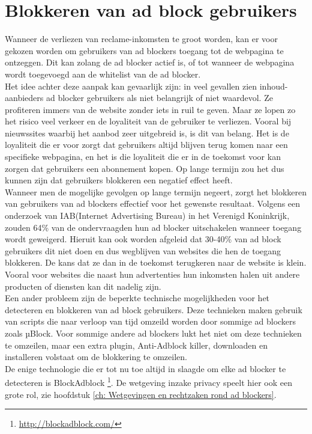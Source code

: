 \documentclass[pdftex,a4paper,12pt,twoside]{report}
\begin{document}
\section{Blokkeren van ad block gebruikers}
\label{sec Blokkeren van ad block gebruikers}
Wanneer de verliezen van reclame-inkomsten te groot worden, kan er voor gekozen worden om gebruikers van ad blockers toegang tot de webpagina te ontzeggen. Dit kan zolang de ad blocker actief is, of tot wanneer de webpagina wordt toegevoegd aan de whitelist van de ad blocker. 
\\
Het idee achter deze aanpak kan gevaarlijk zijn: in veel gevallen zien inhoud-aanbieders ad blocker gebruikers als niet belangrijk of niet waardevol. Ze profiteren immers van de website zonder iets in ruil te geven. Maar ze lopen zo het risico veel verkeer en de loyaliteit van de gebruiker te verliezen. Vooral bij nieuwssites waarbij het aanbod zeer uitgebreid is, is dit van belang. Het is de loyaliteit die er voor zorgt dat gebruikers altijd blijven terug komen naar een specifieke webpagina, en het is die loyaliteit die er in de toekomst voor kan zorgen dat gebruikers een abonnement kopen. Op lange termijn zou het dus kunnen zijn dat gebruikers blokkeren een negatief effect heeft.
\\
Wanneer men de mogelijke gevolgen op lange termijn negeert, zorgt het blokkeren van gebruikers van ad blockers effectief voor het gewenste resultaat. Volgens een onderzoek van IAB(Internet Advertising Bureau) in het Verenigd Koninkrijk, zouden 64\% van de ondervraagden hun ad blocker uitschakelen wanneer toegang wordt geweigerd. Hieruit kan ook worden afgeleid dat 30-40\% van ad block gebruikers dit niet doen en dus wegblijven van websites die hen de toegang blokkeren. De kans dat ze dan in de toekomst terugkeren naar de website is klein. Vooral voor websites die naast hun advertenties hun inkomsten halen uit andere producten of diensten kan dit nadelig zijn.
\\
Een ander probleem zijn de beperkte technische mogelijkheden voor het detecteren en blokkeren van ad block gebruikers. Deze technieken maken gebruik van scripts die naar verloop van tijd omzeild worden door sommige ad blockers zoals µBlock. Voor sommige andere ad blockers lukt het niet om deze technieken te omzeilen, maar een extra plugin, Anti-Adblock killer, downloaden en installeren volstaat om de blokkering te omzeilen.
\\
De enige technologie die er tot nu toe altijd in slaagde om elke ad blocker te detecteren is BlockAdblock \footnote{\url{http://blockadblock.com/}}. De wetgeving inzake privacy speelt hier ook een grote rol, zie hoofdstuk \ref{ch: Wetgevingen en rechtzaken rond ad blockers}.
\end{document}
